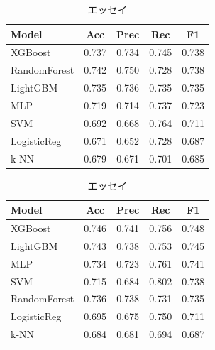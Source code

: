 \documentclass[uplatex, dvipdfmx, 11pt, a4paper, report]{jsbook}
\begin{document}
\begin{table}[H]
  \small
  \begin{minipage}[t]{0.49\textwidth}
    \centering
    \caption{詩}
    \begin{tabular}{l|c|c|c|c} \hline
      Model & Acc & Prec & Rec & F1 \\ \hline
      XGBoost & 0.737 & 0.734 & 0.745 & 0.738 \\
      RandomForest & 0.742 & 0.750 & 0.728 & 0.738 \\
      LightGBM & 0.735 & 0.736 & 0.735 & 0.735 \\
      MLP & 0.719 & 0.714 & 0.737 & 0.723 \\
      SVM & 0.692 & 0.668 & 0.764 & 0.711 \\
      LogisticReg & 0.671 & 0.652 & 0.728 & 0.687 \\
      k-NN & 0.679 & 0.671 & 0.701 & 0.685 \\ \hline
    \end{tabular}
  \end{minipage}
  \hfill
  \begin{minipage}[t]{0.49\textwidth}
    \centering
    \caption{エッセイ}
    \begin{tabular}{l|c|c|c|c} \hline
      Model & Acc & Prec & Rec & F1 \\ \hline
      XGBoost & 0.746 & 0.741 & 0.756 & 0.748 \\
      LightGBM & 0.743 & 0.738 & 0.753 & 0.745 \\
      MLP & 0.734 & 0.723 & 0.761 & 0.741 \\
      SVM & 0.715 & 0.684 & 0.802 & 0.738 \\
      RandomForest & 0.736 & 0.738 & 0.731 & 0.735 \\
      LogisticReg & 0.695 & 0.675 & 0.750 & 0.711 \\
      k-NN & 0.684 & 0.681 & 0.694 & 0.687 \\ \hline
    \end{tabular}
  \end{minipage}
\end{table}
\end{document}

